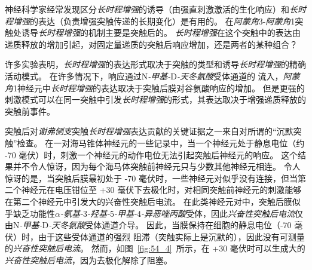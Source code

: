 神经科学家经常发现区分\textit{长时程增强}的诱导（由强直刺激激活的生化响应）和\textit{长时程增强}的表达（负责增强突触传递的长期变化）是有用的。
在\textit{阿蒙角}3-\textit{阿蒙角}1突触处诱导\textit{长时程增强}的机制主要是突触后的。
\textit{长时程增强}在这个突触中的表达由递质释放的增加引起，对固定量递质的突触后响应增加，还是两者的某种组合？


许多实验表明，\textit{长时程增强}的表达形式取决于突触的类型和诱导\textit{长时程增强}的精确活动模式。
在许多情况下，响应通过N\textit{-甲基-}D\textit{-天冬氨酸}受体通道的  流入，\textit{阿蒙角}1神经元中\textit{长时程增强}的表达取决于突触后膜对谷氨酸响应的增加。
但是更强的刺激模式可以在同一突触中引发\textit{长时程增强}的形式，其表达取决于增强递质释放的突触前事件。


突触后对\textit{谢弗侧支}突触\textit{长时程增强}表达贡献的关键证据之一来自对所谓的“沉默突触”检查。
在一对海马锥体神经元的一些记录中，当一个神经元处于静息电位（约 -70 毫伏）时，刺激一个神经元的动作电位无法引起突触后神经元的响应。
这个结果并不令人惊讶，因为每个海马体突触前神经元只与少数其他神经元相连。
令人惊讶的是，当突触后膜最初处于 -70 毫伏时，一些神经元对似乎没有连接，但当第二个神经元在电压钳位至 +30 毫伏下去极化时，对相同突触前神经元的刺激能够在第二个神经元中引发大的兴奋性突触后电流。
在此类神经元对中，突触后膜似乎缺乏功能性\textit{$\alpha$-氨基-}3\textit{-羟基-}5\textit{-甲基-}4\textit{-异恶唑丙酸}受体，因此\textit{兴奋性突触后电流}仅由N\textit{-甲基-}D\textit{-天冬氨酸}受体通道介导。
因此，当膜保持在细胞的静息电位（-70 毫伏）时，由于这些受体通道的强烈  阻滞（突触实际上是沉默的），因此没有可测量的\textit{兴奋性突触后电流}。
然而，如图~\ref{fig:54_4}~所示，在 +30 毫伏时可以生成大的\textit{兴奋性突触后电流}，因为去极化解除了阻塞。


